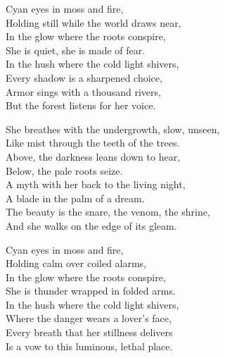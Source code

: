 \begin{lyrics}
Cyan eyes in moss and fire,\\
Holding still while the world draws near,\\
In the glow where the roots conspire,\\
She is quiet, she is made of fear.\\
In the hush where the cold light shivers,\\
Every shadow is a sharpened choice,\\
Armor sings with a thousand rivers,\\
But the forest listens for her voice.

She breathes with the undergrowth, slow, unseen,\\
Like mist through the teeth of the trees.\\
Above, the darkness leans down to hear,\\
Below, the pale roots seize.\\
A myth with her back to the living night,\\
A blade in the palm of a dream.\\
The beauty is the snare, the venom, the shrine,\\
And she walks on the edge of its gleam.

Cyan eyes in moss and fire,\\
Holding calm over coiled alarms,\\
In the glow where the roots conspire,\\
She is thunder wrapped in folded arms.\\
In the hush where the cold light shivers,\\
Where the danger wears a lover’s face,\\
Every breath that her stillness delivers\\
Is a vow to this luminous, lethal place.
\end{lyrics}

